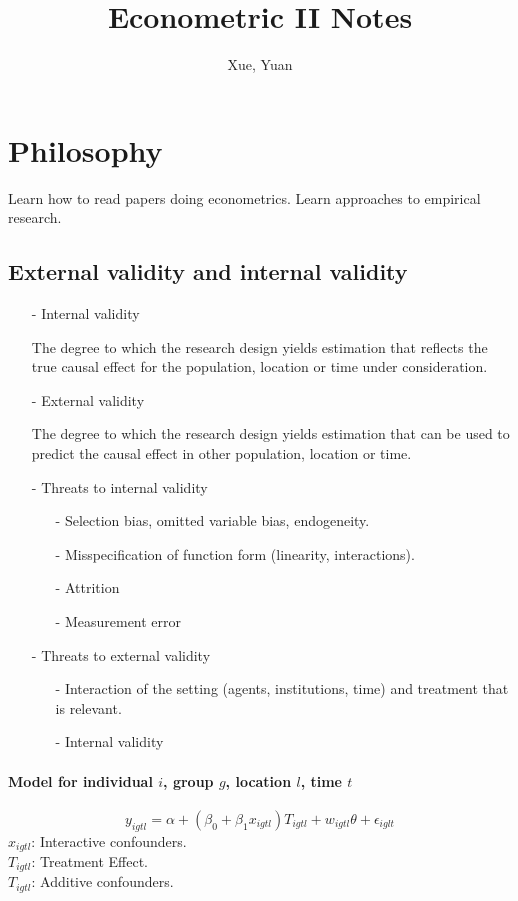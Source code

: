 \documentclass[a4paper,11pt]{article}
\author{Xue, Yuan}
\title{Econometric II Notes}
\begin{document}
\maketitle
\tableofcontents
\section{Philosophy}
Learn how to read papers doing econometrics. Learn approaches to empirical research.
\subsection{External validity and internal validity}
\begin{itemize}
	\item[-] Internal validity
	
The degree to which the research design yields estimation that reflects the true causal effect for the population, location or time under consideration.
	\item[-] External validity
	
The degree to which the research design yields estimation that can be used to predict the causal effect in other population, location or time.
	\item[-] Threats to internal validity
	\begin{itemize}
		\item[-] Selection bias, omitted variable bias, endogeneity.
		\item[-] Misspecification of function form (linearity, interactions).
		\item[-] Attrition
		\item[-] Measurement error
	\end{itemize}
	\item[-] Threats to external validity
	\begin{itemize}
		\item[-] Interaction of the setting (agents, institutions, time) and treatment that is relevant.
		\item[-] Internal validity
	\end{itemize}
\end{itemize}
\paragraph{Model for individual $i$, group $g$, location $l$, time $t$}
\begin{equation}
	y_{igtl}=\alpha +(\beta_0+\beta_1x_{igtl})T_{igtl}+w_{igtl}\theta + \epsilon_{iglt}
\end{equation}
$x_{igtl}$: Interactive confounders.\\
$T_{igtl}$: Treatment Effect.\\
$T_{igtl}$: Additive confounders.
\end{document}
